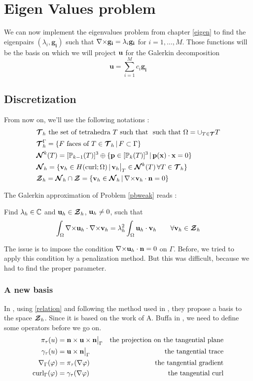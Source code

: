 \chapter{Eigen Values problem}
We can now implement the eigenvalues problem from chapter \ref{eigen} to find the eigenpairs $(\lambda_i,\mathbf{g_i})$ such that ${\nabla\times}\mathbf{g_i}=\lambda_i\mathbf{g_i}$ for $i=1,\dots,M$. Those functions will be the basis on which we will project ${\mathbf{u}}$ for the Galerkin decomposition \[ \mathbf{u}=\sum_{i=1}^M c_i\mathbf{g_i} \]

\section{Discretization}
From now on, we'll use the following notations :
\begin{align*}
&{\bm{\mathcal{T}}}_h\mbox{ the set of tetrahedra } T \mbox{ such that }
\mbox{ such that } \Omega=\cup_{T\in{\bm{\mathcal{T}}}}T\\
&{\bm{\mathcal{T}}}_h^\Gamma =\{F\mbox{ faces of } T\in {\bm{\mathcal{T}}}_h \,|\, F\subset \Gamma
\}\\
&{\bm{\mathcal{N}}}^k(T)=[{\mathbb{P}}_{k-1}(T)]^3\oplus\{{\mathbf{p}}\in[{\mathbb{P}}_k(T)]^3 \,|\,
{\mathbf{p(x)}}\cdot{\mathbf{x}}=0 \}\\
&{\bm{\mathcal{N}}}_h=\{{\mathbf{v}}_h\in H(\mathrm{curl};\Omega) \,|\,
{\mathbf{v}}_h{\big\rvert_{T}}\in{\bm{\mathcal{N}}}^k(T)\, \forall T\in {\bm{\mathcal{T}}}_h \}\\
&{\bm{\mathcal{Z}}}_h={\bm{\mathcal{N}}}_h\cap{\bm{\mathcal{Z}}}=\{{\mathbf{v}}_h\in{\bm{\mathcal{N}}}_h \,|\,
{\nabla\times}{\mathbf{v}}_h\cdot{\mathbf{n}} = 0 \}
\end{align*}

The Galerkin approximation of Problem \ref{pbweak} reads :
\begin{pb}\label{pbdiscr}
Find $\lambda_h\in{\mathbb{C}}$ and ${\mathbf{u}}_h\in{\bm{\mathcal{Z}}}_h$, ${\mathbf{u}}_h\ne
0$, such that
\[\int_\Omega {\nabla\times}{\mathbf{u}}_h\cdot{\nabla\times}{\mathbf{v}}_h =
\lambda_h^2\int_\Omega {\mathbf{u}}_h\cdot{\mathbf{v}}_h \quad\quad
\forall{\mathbf{v}}_h\in{\bm{\mathcal{Z}}}_h \]
\end{pb}

The issue is to impose the condition
${\nabla\times}{\mathbf{u}}_h\cdot{\mathbf{n}}=0$ on $\Gamma$. Before, we tried to apply this
condition by a penalization method. But this was difficult, because we had to
find the proper parameter.\\

\subsection{A new basis}
\label{base}
In \cite{Venegas2013}, using \ref{relation} and following the method used in
\cite{Meddahi2003,Salgado2005}, they propose a basis to the space ${\bm{\mathcal{Z}}}_h$.
Since it is based on the work of A. Buffa in \cite{Buffa2002845}, we need to
define some operators before we go on.
\begin{align*}
\pi_\tau(u) &= {\mathbf{n}}\times{\mathbf{u}}\times{\mathbf{n}}{\big\rvert_{\Gamma}} &\mbox{the projection on
  the tangential plane}\\
\gamma_\tau(u) &= {\mathbf{u}}\times{\mathbf{n}}{\big\rvert_{\Gamma}} &\mbox{the tangential
  trace}\\
{\nabla}_\Gamma(\varphi) &= \pi_\tau({\nabla}\varphi) &\mbox{the tangential gradient}\\
\mathrm{curl}_\Gamma(\varphi) &= \gamma_\tau({\nabla}\varphi) &\mbox{the tangential curl}
\end{align*}

